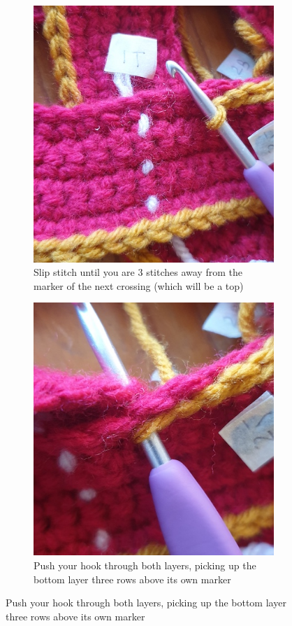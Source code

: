 \documentclass[openany]{book}
\begin{document}
\begin{figure}[H]\centering
\begin{subfigure}[t]{.45\textwidth}\centering
\includegraphics[width=.95\textwidth]{bk/top5}
\caption{Slip stitch until you are 3 stitches away from the marker of the next crossing (which will be a top)}
\end{subfigure}
%
\begin{subfigure}[t]{.45\textwidth}
		\centering
		\includegraphics[width=.95\textwidth]{bk/top6}
\caption{Push your hook through both layers, picking up the bottom layer three rows above its own marker}
\end{subfigure}



\end{figure}
\end{document}

